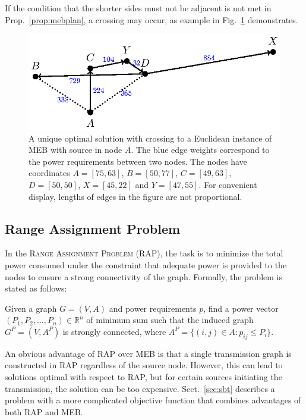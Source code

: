If the condition that the shorter sides must not be adjacent is not met in Prop.~\ref{prop:mebplan}, a crossing may occur, as example in Fig.~\ref{fig:mebnonplan} demonstrates.
\begin{figure}[htb!]
  \centering
  \includegraphics[scale=1.4]{figurer/mebnonplanar.eps}
  \caption{A unique optimal solution with crossing to a Euclidean instance of  MEB with source in node $A$.
  The blue edge weights correspond to the power requirements between two nodes. 
  The nodes have coordinates $A=[75,63]$, $B=[50,77]$, $C=[49,63]$, $D=[50,50]$, $X=[45,22]$ and $Y=[47,55]$.
  For convenient display, lengths of edges in the figure are not proportional.}
  \label{fig:mebnonplan}
\end{figure}

\subsection{Range Assignment Problem}

In the \textsc{Range Assignment Problem} (RAP), the task is to minimize the total power consumed under the constraint 
that adequate power is provided to the nodes to ensure a strong connectivity of the graph.
Formally, the problem is stated as follows:
\begin{problem}
Given a graph $G=(V,A)$ and power requirements $p$, find a power vector $(P_1,P_2,\dots,P_n)\in\mathbb{R}^n$ of minimum sum such that the induced graph $G^P=(V,A^P)$ is strongly connected, 
where $A^P=\{(i,j)\in A: p_{ij}\leq P_i\}$.
\end{problem}

An obvious advantage of RAP over MEB is that a single transmission graph is constructed in RAP regardless of the source node.
However, this can lead to solutions optimal with respect to RAP, but for certain sources initiating the transmission, the solution can be too expensive.
Sect.~\ref{sec:sbt} describes a problem with a more complicated objective function that combines advantages of both RAP and MEB.

